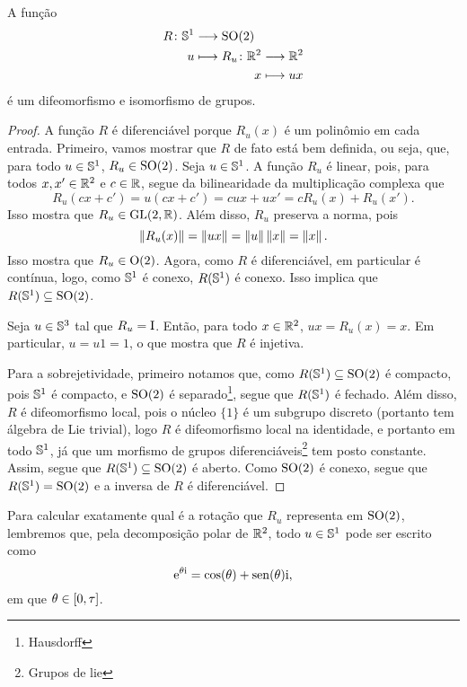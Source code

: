 \begin{proposition}
A função
	\begin{align*}
	\func{R}{\S^1}{\SO(2)}{u}{
		\begin{aligned}[t]
			\func{R_u}{\R^2}{\R^2}{x}{ux}
		\end{aligned}
	}
	\end{align*}
é um difeomorfismo e isomorfismo de grupos.
\end{proposition}
\begin{proof}
A função $R$ é diferenciável porque $R_u(x)$ é um polinômio em cada entrada. Primeiro, vamos mostrar que $R$ de fato está bem definida, ou seja, que, para todo $u \in \S^1$, $R_u \in \SO(2)$. Seja $u \in \S^1$. A função $R_u$ é linear, pois, para todos $x,x' \in \R^2$ e $c \in \R$, segue da bilinearidade da multiplicação complexa que
	\begin{equation*}
	R_u(cx+c') = u(cx+c') = cux + ux' = cR_u(x) + R_u(x').
	\end{equation*}
Isso mostra que $R_u \in \GL(2,\R)$. Além disso, $R_u$ preserva a norma, pois
	\begin{equation*}
	\nor{R_u(x)} = \nor{ux} = \nor{u}\nor{x} = \nor{x}.
	\end{equation*}
Isso mostra que $R_u \in \OO(2)$. Agora, como $R$ é diferenciável, em particular é contínua, logo, como $\S^1$ é conexo, $R(\S^1)$ é conexo. Isso implica que $R(\S^1) \subseteq \SO(2)$.

Seja $u \in \S^3$ tal que $R_u = \Id$. Então, para todo $x \in \R^2$, $ux = R_u(x) = x$. Em particular, $u = u1 = 1$, o que mostra que $R$ é injetiva.

Para a sobrejetividade, primeiro notamos que, como $R(\S^1) \subseteq \SO(2)$ é compacto, pois $\S^1$ é compacto, e $\SO(2)$ é separado\footnote{Hausdorff}, segue que $R(\S^1)$ é fechado. Além disso, $R$ é difeomorfismo local, pois o núcleo $\{1\}$ é um subgrupo discreto (portanto tem álgebra de Lie trivial), logo $R$ é difeomorfismo local na identidade, e portanto em todo $\S^1$, já que um morfismo de grupos diferenciáveis\footnote{Grupos de lie} tem posto constante. Assim, segue que $R(\S^1) \subseteq \SO(2)$ é aberto. Como $\SO(2)$ é conexo, segue que $R(\S^1) = \SO(2)$ e a inversa de $R$ é diferenciável.
\end{proof}

Para calcular exatamente qual é a rotação que $R_u$ representa em $\SO(2)$, lembremos que, pela decomposição polar de $\R^2$, todo $u \in \S^1$ pode ser escrito como
	\begin{equation*}
	\e^{\theta\ii} = \cos(\theta) + \sin(\theta)\ii,
	\end{equation*}
em que $\theta \in \intff{0}{\tau}$.

